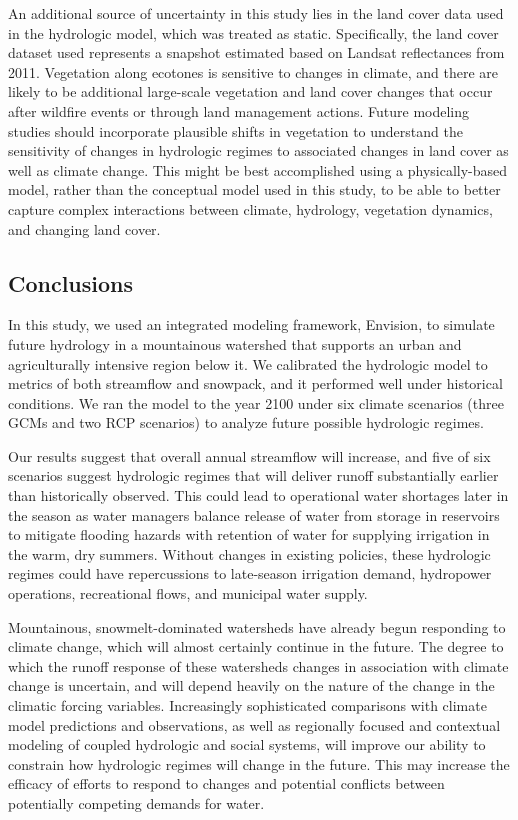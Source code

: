 \documentclass[11pt,letterpaper]{article}
\begin{document}
An additional source of uncertainty in this study lies in the land cover data used in the hydrologic model, which was treated as static. Specifically, the land cover dataset used represents a snapshot estimated based on Landsat reflectances from 2011. Vegetation along ecotones is sensitive to changes in climate, and there are likely to be additional large-scale vegetation and land cover changes that occur after wildfire events or through land management actions. Future modeling studies should incorporate plausible shifts in vegetation to understand the sensitivity of changes in hydrologic regimes to associated changes in land cover as well as climate change. This might be best accomplished using a physically-based model, rather than the conceptual model used in this study, to be able to better capture complex interactions between climate, hydrology, vegetation dynamics, and changing land cover.


\subsection{Conclusions}

In this study, we used an integrated modeling framework, Envision, to simulate future hydrology in a mountainous watershed that supports an urban and agriculturally intensive region below it. We calibrated the hydrologic model to metrics of both streamflow and snowpack, and it performed well under historical conditions. We ran the model to the year 2100 under six climate scenarios (three GCMs and two RCP scenarios) to analyze future possible hydrologic regimes. 

Our results suggest that overall annual streamflow will increase, and five of six scenarios suggest hydrologic regimes that will deliver runoff substantially earlier than historically observed. This could lead to operational water shortages later in the season as water managers balance release of water from storage in reservoirs to mitigate flooding hazards with retention of water for supplying irrigation in the warm, dry summers. Without changes in existing policies, these hydrologic regimes could have repercussions to late-season irrigation demand, hydropower operations, recreational flows, and municipal water supply. 

Mountainous, snowmelt-dominated watersheds have already begun responding to climate change, which will almost certainly continue in the future. The degree to which the runoff response of these watersheds changes in association with climate change is uncertain, and will depend heavily on the nature of the change in the climatic forcing variables. Increasingly sophisticated comparisons with climate model predictions and observations, as well as regionally focused and contextual modeling of coupled hydrologic and social systems, will improve our ability to constrain how hydrologic regimes will change in the future. This may increase the efficacy of efforts to respond to changes and potential conflicts between potentially competing demands for water.
\end{document}
